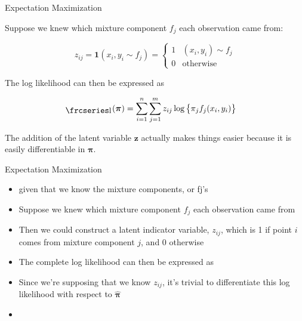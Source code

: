 \documentclass{beamer}
\newcommand{\textfrc}[1]{{\frcseries#1}}
\newcommand{\mathfrc}[1]{\raisebox{-0.8mm}{\text{\textfrc{\small #1}}}\hspace{0.4mm}}
\newcommand{\eqn}[1]{\begin{align*}
#1
\end{align*}}
\newcommand{\vect}[1]{\boldsymbol{\mathbf{#1}}}
\newcommand{\bl}{\big\{}
\newcommand{\br}{\big\}}
\newcommand{\eqnset}[4]{
\[ #1 = #2 \left\{ \begin{array}{#3}
        #4
\end{array} \right. \] 
}
\newcommand{\indicator}{\mathbf{1}}
\newcommand{\vp}{\vect{\pi}}
\newcommand{\vph}{\hat{\vect{\pi}}}
\newcommand{\sumn}{\sum^n_{i=1}}
\newcommand{\summ}{\sum^m_{j=1}}
\newcommand{\fab}{f_j}
\newcommand{\llp}{\mathfrc{l}(\vect{\pi})}
\begin{document}
\begin{frame}{Expectation Maximization}
	
	Suppose we knew which mixture component $f_j$ each observation came from:
	
	\eqnset{z_{ij} = \indicator(x_i,y_i \sim f_j) }{}{ll}{
		1			& (x_i,y_i) \sim f_j 		\\
		0		& \text{otherwise}
	}
	
	The log likelihood can then be expressed as
	
	\eqn{
		\llp &= \sumn \summ z_{ij}  \log \bl \pi_j  \fab(x_i,y_i) \br
	}
	
	The addition of the latent variable $\vect{z}$ actually makes things easier because it is easily differentiable in $\vp$.
	
\end{frame}
\begin{frame}[shrink]{Expectation Maximization}
	
	\begin{itemize}
		\item given that we know the mixture components, or fj's
		\item Suppose we knew which mixture component $f_j$ each observation came from
		\item Then we could construct a latent indicator variable, $z_{ij}$, which is 1 if point $i$ comes from mixture component $j$, and 0 otherwise
		\item The complete log likelihood can then be expressed as
		\item Since we're supposing that we know $z_{ij}$, it's trivial to differentiate this log likelihood with respect to $\vph$
		\item 
	\end{itemize}
	
\end{frame}
\end{document}
